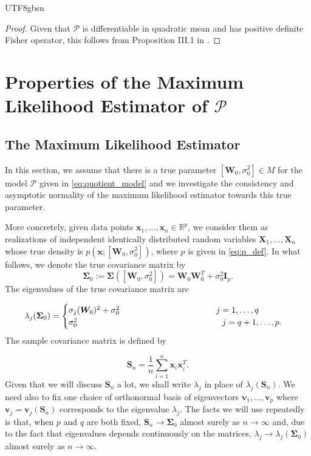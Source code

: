 \documentclass[12pt]{report}
\newcommand\tab[1][1cm]{\hspace*{#1}}
\theoremstyle{plain}
\theoremstyle{definition}
\begin{document}
\begin{CJK*}{UTF8}{gbsn}
\begin{proof}
Given that $\mathcal{P}$ is differentiable in quadratic mean
and has positive definite Fisher operator,
this follows from Proposition III.1 in \cite{Sun_Lin_Liu_2026}.
\end{proof}

\section{Properties of the Maximum Likelihood Estimator of $\mathcal{P}$}\label{sec:MLE}

\subsection{The Maximum Likelihood Estimator}
In this section, we assume that 
there is a true parameter $[\bm{W}_0, \sigma_0^2] \in M$
for the model $\mathcal{P}$ given in \eqref{eq:quotient_model}
and we investigate the consistency and asymptotic normality
of the maximum likelihood estimator towards this true parameter.

More concretely,
given data points $\bm{x}_1, \ldots, \bm{x}_n \in \mathbb{R}^p$,
we consider them as realizations of independent 
identically distributed random 
variables $\bm{X}_1, \ldots, \bm{X}_n$
whose true density is $p(\bm{x}; [\bm{W}_0, \sigma_0^2])$,
where $p$ is given in \eqref{eq:p_def}.
In what follows, 
we denote the true covariance 
matrix by 
\begin{equation}\label{eq:Sigma_0_def}
  \bm{\Sigma}_0 := \bm{\Sigma}([\bm{W}_0, \sigma_0^2])
= \bm{W}_0\bm{W}_0^T + \sigma_0^2\bm{I}_p.
\end{equation}
The eigenvalues of the true covariance matrix are

\begin{equation}\label{eq:lambda_j_Sigma_0}
  \lambda_j(\bm{\Sigma}_0)
  = 
  \begin{cases}
    \sigma_j(\bm{W}_0)^2 + \sigma_0^2 \tab[4.0cm] j = 1, \ldots, q \\
    \sigma_0^2                        \tab[6.0cm] j = q+1, \ldots, p.
  \end{cases}
\end{equation}
The sample covariance matrix is defined by 

\begin{equation}\label{eq:S_n_def}
  \bm{S}_n = \frac{1}{n} \sum_{i=1}^n \bm{x}_i\bm{x}_i^T.
\end{equation}
Given that we will discuss $\bm{S}_n$ a lot, 
we shall write $\lambda_j$ in place of $\lambda_j(\bm{S}_n)$.
We need also to fix one choice of 
orthonormal basis of eigenvectors $\bm{v}_1, \ldots, \bm{v}_p$
where $\bm{v}_j = \bm{v}_j(\bm{S}_n)$ corresponds to the eigenvalue $\lambda_j$.
The facts we will use 
repeatedly is that, when $p$ and $q$ are both fixed,
$\bm{S}_n \to \bm{\Sigma}_0$ almost surely as $n \to \infty$
and, due to the fact that eigenvalues depends continuously 
on the matrices, $\lambda_j \to \lambda_j(\bm{\Sigma}_0)$
almost surely as $n \to \infty$.


\end{CJK*}
\end{document}
